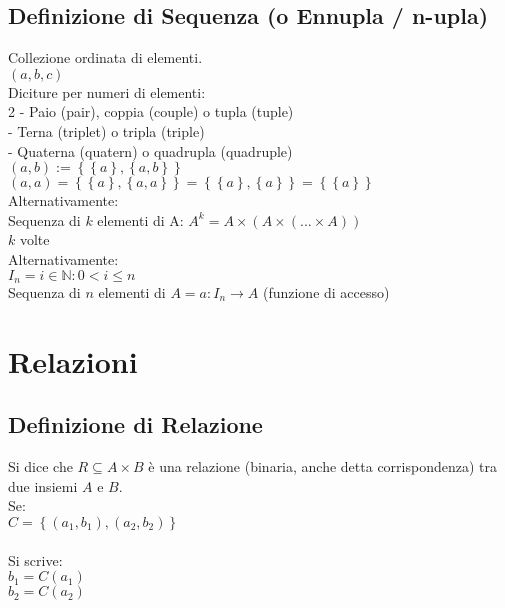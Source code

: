 \documentclass[a4paper, twoside, italian, 11pt]{book}
\newcommand{\braces}[1] {\left\{#1\right\}}
\newcommand{\N}{\mathbb{N}}
\begin{document}
\section{Definizione di Sequenza (o Ennupla / n-upla)}

Collezione ordinata di elementi. \\

$(a, b, c)$ \\

\noindent
Diciture per numeri di elementi: \\

2 - Paio (pair), coppia (couple) o tupla (tuple) \\
 - Terna (triplet) o tripla (triple) \\
 - Quaterna (quatern) o quadrupla (quadruple) \\

\noindent
$(a, b) := \braces{\braces{a}, \braces{a, b}}$ \\
$(a, a) = \braces{\braces{a}, \braces{a, a}} = \braces{\braces{a}, \braces{a}} = \braces{\braces{a}}$ \\

\noindent
Alternativamente: \\
\indent
Sequenza di $k$ elementi di A: $A^k = A \times (A \times (... \times A))$ \\
\indent
$k$ volte \\

\noindent
Alternativamente: \\
\indent
$I_n = {i \in \N : 0 < i \leq n}$ \\
\indent
Sequenza di $n$ elementi di $A = a : I_n \rightarrow A$ (funzione di accesso)



\chapter{Relazioni}



\section{Definizione di Relazione}

Si dice che $R \subseteq A \times B$ è una relazione (binaria, anche detta corrispondenza) tra due insiemi $A$ e $B$.\\

\noindent
Se: \\
$C = \braces{(a_1, b_1), (a_2, b_2)}$ \\\\
Si scrive:\\
$b_1 = C(a_1)$ \\
$b_2 = C(a_2)$
\end{document}
